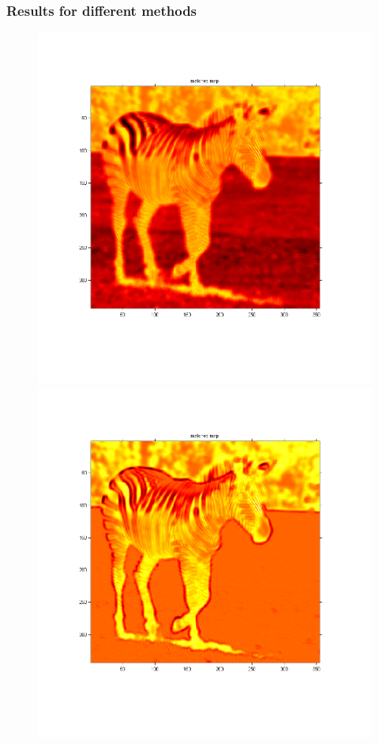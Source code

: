 \documentclass[compress]{beamer} %
\begin{document}
\begin{frame}
\frametitle{Results for different methods}
\begin{figure}
\centering
\begin{minipage}{0.3\linewidth}
\includegraphics[width=1.3\linewidth]{zebra_heatmap_euclidian.png}
\end{minipage}
\begin{minipage}{0.3\linewidth}
\includegraphics[width=1.3\linewidth]{zebra_heatmap_similarity.png}

\end{minipage}
\end{figure}
\end{frame}
\end{document}
